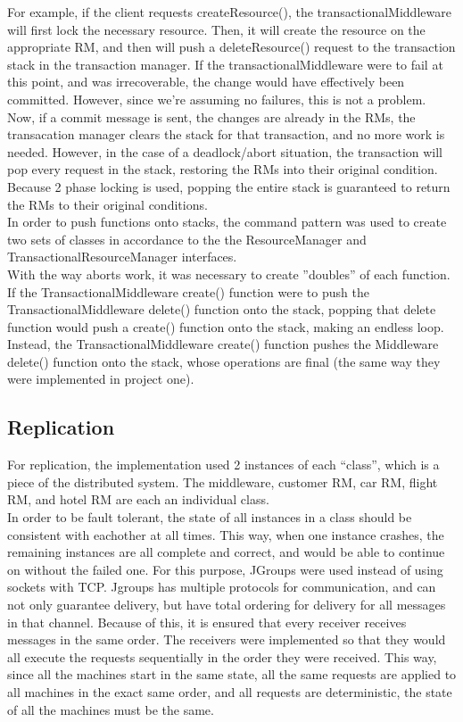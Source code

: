 \documentclass[letterpaper,12pt]{article}
\begin{document}
	For example, if the client requests createResource(), the transactionalMiddleware will first lock the necessary resource. Then, it will create the resource on the appropriate RM, and then will push a deleteResource() request to the transaction stack in the transaction manager. If the transactionalMiddleware were to fail at this point, and was irrecoverable, the change would have effectively been committed. However, since we're assuming no failures, this is not a problem. Now, if a commit message is sent, the changes are already in the RMs, the transacation manager clears the stack for that transaction, and no more work is needed. However, in the case of a deadlock/abort situation, the transaction will pop every request in the stack, restoring the RMs into their original condition. Because 2 phase locking is used, popping the entire stack is guaranteed to return the RMs to their original conditions.\\
	
	In order to push functions onto stacks, the command pattern was used to create two sets of classes in accordance to the the ResourceManager and TransactionalResourceManager interfaces.\\
	
	With the way aborts work, it was necessary to create ''doubles'' of each function. If the TransactionalMiddleware create() function were to push the TransactionalMiddleware delete() function onto the stack, popping that delete function would push a create() function onto the stack, making an endless loop. Instead, the TransactionalMiddleware create() function pushes the Middleware delete() function onto the stack, whose operations are final (the same way they were implemented in project one).\\

    \subsection*{Replication}

    For replication, the implementation used 2 instances of each ``class'', which is a piece of the distributed system. The middleware, customer RM, car RM, flight RM, and hotel RM are each an individual class.\\

    In order to be fault tolerant, the state of all instances in a class should be consistent with eachother at all times. This way, when one instance crashes, the remaining instances are all complete and correct, and would be able to continue on without the failed one. For this purpose, JGroups were used instead of using sockets with TCP. Jgroups has multiple protocols for communication, and can not only guarantee delivery, but have total ordering for delivery for all messages in that channel. Because of this, it is ensured that every receiver receives messages in the same order. The receivers were implemented so that they would all execute the requests sequentially in the order they were received. This way, since all the machines start in the same state, all the same requests are applied to all machines in the exact same order, and all requests are deterministic, the state of all the machines must be the same.\\
\end{document}
